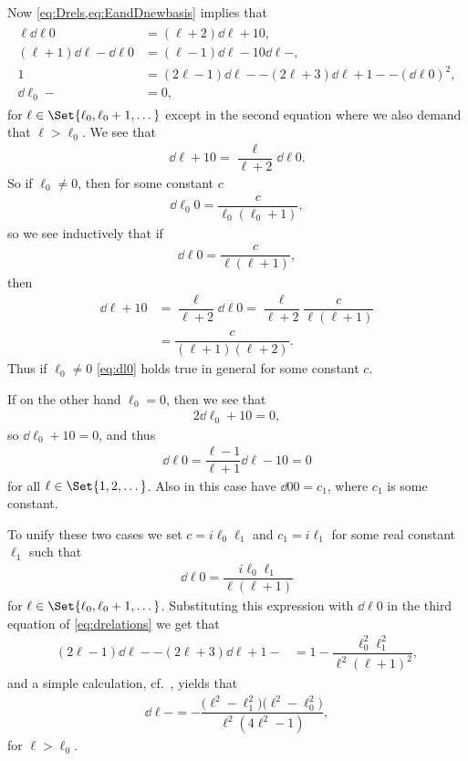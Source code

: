 Now \cref{eq:Drels,eq:EandDnewbasis} implies that
\begin{align}\label{eq:drelations}
  \begin{aligned}
    \ell \dd{\ell}{0} &= (\ell+2)\dd{\ell+1}{0}, \\
    (\ell+1)\dd{\ell}{-}\dd{\ell}{0} &= (\ell-1)\dd{\ell-1}{0}\dd{\ell}{-}, \\
    1 &= (2\ell-1)\dd{\ell}{-} - (2\ell+3)\dd{\ell+1}{-} - (\dd{\ell}{0})^2,\\
    \dd{\ell_0}{-} &= 0,
  \end{aligned}
\end{align}
for $\ell\in\Set{\ell_0,\ell_0+1,\dotsc}$ except in the second equation where we also demand that $\ell>\ell_0$. We see that
\begin{align*}
  \dd{\ell+1}{0} = \dfrac{\ell}{\ell+2}\dd{\ell}{0}.
\end{align*}
So if $\ell_0\neq0$, then for some constant $c$ 
\begin{align*}
  \dd{\ell_0}{0} = \dfrac{c}{\ell_0(\ell_0+1)},
\end{align*}
so we see inductively that if
\begin{align}\label{eq:dl0}
  \dd{\ell}{0} = \dfrac{c}{\ell(\ell+1)},
\end{align}
then
\begin{align*}
  \dd{\ell+1}{0} &= \dfrac{\ell}{\ell+2}\dd{\ell}{0} = \dfrac{\ell}{\ell+2}\dfrac{c}{\ell(\ell+1)} \\
  &= \dfrac{c}{(\ell+1)(\ell+2)}.
\end{align*}
Thus if $\ell_0\neq 0$ \cref{eq:dl0} holds true in general for some constant $c$. 

If on the other hand $\ell_0=0$, then we see that
\begin{align*}
  2\dd{\ell_0+1}{0} = 0,
\end{align*}
so $\dd{\ell_0+1}{0}=0$, and thus
\begin{align*}
  \dd{\ell}{0} = \dfrac{\ell-1}{\ell+1}\dd{\ell-1}{0} = 0
\end{align*}
for all $\ell\in\Set{1,2,\dotsc}$. Also in this case have $\dd{0}{0}=c_1$, where $c_1$ is some constant. 

To unify these two cases we set $c=i\ell_0\ell_1$ and $c_1=i\ell_1$ for some real constant $\ell_1$ such that
\begin{align}\label{eq:dl0res}
  \dd{\ell}{0} = \dfrac{i\ell_0\ell_1}{\ell(\ell+1)}
\end{align}
for $\ell\in\Set{\ell_0,\ell_0+1,\dotsc}$. Substituting this expression with $\dd{\ell}{0}$ in the third equation of \cref{eq:drelations} we get that
\begin{align*}
  (2\ell-1)\dd{\ell}{-} - (2\ell+3)\dd{\ell+1}{-} &= 1 - \dfrac{\ell_0^2\ell_1^2}{\ell^2(\ell+1)^2},
\end{align*}
and a simple calculation, cf.\ , yields that
\begin{align}\label{dl-res}
  \dd{\ell}{-} = -\dfrac{\bigl(\ell^2 - \ell_1^2\bigr)\bigl( \ell^2 - \ell_0^2 \bigr)}{\ell^2(4\ell^2-1)},
\end{align}
for $\ell>\ell_0$.

